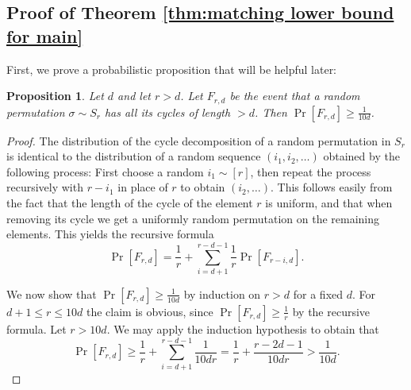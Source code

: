 \documentclass[11pt, letterpaper]{amsart}
\newtheorem{proposition}[thm]{Proposition}
\renewcommand\ge{\geqslant}
\renewcommand\le{\leqslant}
\begin{document}
\subsection{Proof of Theorem \ref{thm:matching lower bound for main}}
First, we prove a probabilistic proposition that will be helpful
later:
\begin{proposition} \label{prop:probability no short cycles}
    Let $d$ and let $r>d$. Let $F_{r,d}$ be the event that a random permutation $\sigma\sim S_r$ has all its cycles of length $>d$. Then $\Pr[F_{r,d}]\ge \frac{1}{10d}$.
\end{proposition}
\begin{proof}
The distribution of the cycle decomposition of a random permutation in $S_r$ is identical to the distribution of a random sequence $(i_1,i_2,\dots)$ obtained by the following process: First choose a random $i_1\sim [r]$, then repeat the process recursively with $r-i_1$ in place of $r$ to obtain $(i_2,\dots)$. This follows easily from the fact that the length of the cycle of the element $r$ is uniform, and that when removing its cycle we get a uniformly random permutation on the remaining elements. 
This yields the recursive formula \[ \Pr[F_{r,d}] = \frac{1}{r} + \sum_{i=d+1}^{r-d-1}\frac{1}{r}\Pr[F_{r-i,d}].\]

We now show that $\Pr[F_{r,d}]\ge \frac{1}{10d}$ by induction on $r> d$ for a fixed $d$. For $d+1 \le r \le 10d$ the claim is obvious, since $\Pr[F_{r,d}] \ge \frac{1}{r}$ by the recursive formula. Let $r > 10d$. We may apply the induction hypothesis to obtain that
\[
    \Pr[F_{r,d}]\ge \frac{1}{r} + \sum_{i=d+1}^{r-d-1} \frac{1}{10dr} = \frac{1}{r}+\frac{r-2d-1}{10dr}>\frac{1}{10 d}.
\]
\end{proof}
\end{document}
